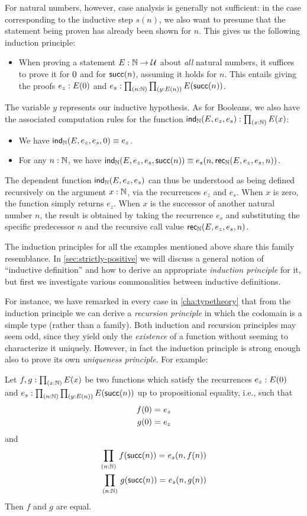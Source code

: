 For natural numbers, however, case analysis is generally not sufficient: in the case corresponding to the inductive step $s(n)$, we also want to presume that the statement being proven has already been shown for $n$.
This gives us the following induction principle:
\begin{itemize}
\item When proving a statement $E : \mathbb{N} \to \mathcal{U}$ about \emph{all} natural numbers, it suffices to prove it for $0$ and for $\mathsf{succ}(n)$, assuming it holds
for $n$. This entails giving the proofs $e_z : E(0)$ and $e_s : \prd{n : \nat}{y : E(n)} E(\s(n))$.
\end{itemize}
The variable $y$ represents our inductive hypothesis.  As for Booleans, we also have the associated computation rules for the function $\ind\nat(E,e_z,e_s) : \prd{x:\nat} E(x)$:
\begin{itemize}
\item We have $\mathsf{ind}_{\mathbb{N}}(E,e_z,e_s,0) \equiv e_z$.
\item For any $n : \mathbb{N}$, we have $\mathsf{ind}_{\mathbb{N}}(E,e_z,e_s,\mathsf{succ}(n)) \equiv e_s(n,\mathsf{rec}_{\mathbb{N}}(E,e_z,e_s,n))$.
\end{itemize}
The dependent function $\mathsf{ind}_{\mathbb{N}}(E,e_z,e_s)$ can thus be understood as being defined recursively on the argument $x : \mathbb{N}$, via the recurrences $e_z$ and $e_s$.
When $x$ is zero, the function simply returns $e_z$.
When $x$ is the successor of another natural number $n$, the result is obtained by taking the recurrence $e_s$ and substituting the specific predecessor $n$ and the recursive call value $\mathsf{rec}_{\mathbb{N}}(E,e_z,e_s,n)$.

The induction principles for all the examples mentioned above share this family resemblance.
In \autoref{sec:strictly-positive} we will discuss a general notion of ``inductive definition'' and how to derive an appropriate \emph{induction principle} for it, but first we investigate various commonalities between inductive definitions.

For instance, we have remarked in every case in \autoref{cha:typetheory} that from the induction principle we can derive a \emph{recursion principle} in which the codomain is a simple type (rather than a family).
Both induction and recursion principles may seem odd, since they yield only the \emph{existence} of a function without seeming to characterize it uniquely.
However, in fact the induction principle is strong enough also to prove its own \emph{uniqueness principle}.
For example:

\begin{thm}\label{thm:nat-uniq}
Let $f,g : \prd{x:\nat} E(x)$ be two functions which satisfy the recurrences $e_z : E(0)$ and $e_s : \prd{n : \nat}{y : E(n)} E(\s(n))$ up to propositional equality, i.e., such that
\begin{align*}
f(0) =_{} e_z \\ 
g(0) =_{} e_z
\end{align*}
and 
\begin{align*}
\prd{n : \nat} \id{f(\s(n))}{e_s(n, f(n))} \\
\prd{n : \nat} \id{g(\s(n))}{e_s(n, g(n))}
\end{align*}
Then $f$ and $g$ are equal. 
\end{thm}

